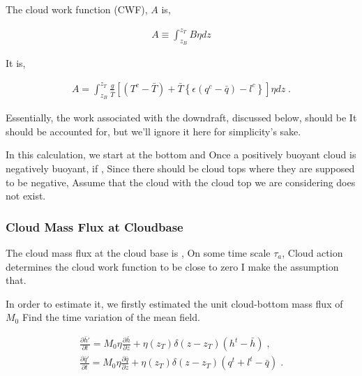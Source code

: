 The cloud work function (CWF), \(A\) is,

\begin{eqnarray}
  A \equiv \int_{z_B}^{z_T} B \eta dz 
\end{eqnarray}

It is,

\begin{eqnarray}
A = \int_{z_B}^{z_T} \frac{g}{\bar{T}} \left[
        (T^c-\bar{T})
      + \bar{T} \left\{ \epsilon (q^c - \bar{q} ) 
                     - l^c                 \right\}
       \right] \eta dz \; .
\end{eqnarray}

\begin{quote}
\protect\hypertarget{p-cum:cwf}{}{}
\end{quote}

Essentially, the work associated with the downdraft, discussed below,
should be It should be accounted for, but we'll ignore it here for
simplicity's sake.

In this calculation, we start at the bottom and Once a positively
buoyant cloud is negatively buoyant, if , Since there should be cloud
tops where they are supposed to be negative, Assume that the cloud with
the cloud top we are considering does not exist.

\hypertarget{cloud-mass-flux-at-cloudbase}{%
\subsubsection{Cloud Mass Flux at
Cloudbase}\label{cloud-mass-flux-at-cloudbase}}

The cloud mass flux at the cloud base is , On some time scale
\(\tau_a\), Cloud action determines the cloud work function to be close
to zero I make the assumption that.

In order to estimate it, we firstly estimated the unit cloud-bottom mass
flux of \(M_0\) Find the time variation of the mean field.

\begin{eqnarray}
  \frac{\partial \bar{h}'}{\partial t}  =  M_0 \eta \frac{\partial \bar{h}}{\partial z} 
                       + \eta(z_T) \delta(z-z_T) ( h^t - \bar{h} ) \; , \\
  \frac{\partial \bar{q}'}{\partial t}  =  M_0 \eta \frac{\partial \bar{q}}{\partial z} 
                       + \eta(z_T) \delta(z-z_T) ( q^t + l^t - \bar{q} ) \; .
\end{eqnarray}

